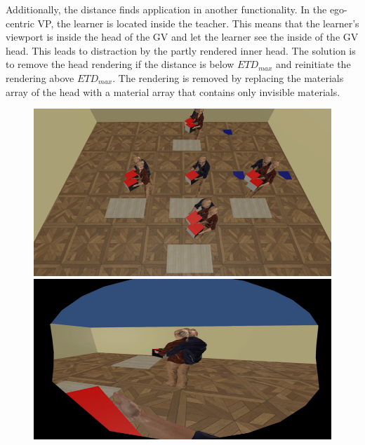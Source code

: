 Additionally, the distance finds application in another functionality. In the ego-centric VP, the learner is located inside the teacher. This means that the learner's viewport is inside the head of the GV and let the learner see the inside of the GV head. This leads to distraction by the partly rendered inner head. The solution is to remove the head rendering if the distance is below $ETD_{max}$ and reinitiate the rendering above $ETD_{max}$. The rendering is removed by replacing the materials array of the head with a material array that contains only invisible materials.\\
\begin{figure}[htb]
	\centering
	\includegraphics[width=\textwidth]{figures/perspectiveEXO.png}
	\caption[]{}
	\label{fig:exo}
\end{figure}

